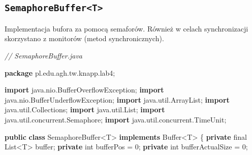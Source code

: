 \documentclass[11pt]{article}
\newenvironment{Shaded}{}{}
\newcommand{\KeywordTok}[1]{\textcolor[rgb]{0.00,0.44,0.13}{\textbf{{#1}}}}
\newcommand{\DataTypeTok}[1]{\textcolor[rgb]{0.56,0.13,0.00}{{#1}}}
\newcommand{\DecValTok}[1]{\textcolor[rgb]{0.25,0.63,0.44}{{#1}}}
\newcommand{\CommentTok}[1]{\textcolor[rgb]{0.38,0.63,0.69}{\textit{{#1}}}}
\newcommand{\NormalTok}[1]{{#1}}
\newcommand{\ImportTok}[1]{{#1}}
\newcommand{\OperatorTok}[1]{\textcolor[rgb]{0.40,0.40,0.40}{{#1}}}
\newcommand{\BuiltInTok}[1]{{#1}}
\begin{document}
    \hypertarget{semaphorebuffert}{%
\subsection{\texorpdfstring{\texttt{SemaphoreBuffer\textless{}T\textgreater{}}}{SemaphoreBuffer\textless T\textgreater{}}}\label{semaphorebuffert}}

Implementacja bufora za pomocą semaforów. Również w celach
synchronizacji skorzystano z monitorów (metod synchronicznych).

\begin{Shaded}
\begin{Highlighting}[]
\CommentTok{// SemaphoreBuffer.java}

\KeywordTok{package}\ImportTok{ pl}\OperatorTok{.}\ImportTok{edu}\OperatorTok{.}\ImportTok{agh}\OperatorTok{.}\ImportTok{tw}\OperatorTok{.}\ImportTok{knapp}\OperatorTok{.}\ImportTok{lab4}\OperatorTok{;}

\KeywordTok{import} \ImportTok{java}\OperatorTok{.}\ImportTok{nio}\OperatorTok{.}\ImportTok{BufferOverflowException}\OperatorTok{;}
\KeywordTok{import} \ImportTok{java}\OperatorTok{.}\ImportTok{nio}\OperatorTok{.}\ImportTok{BufferUnderflowException}\OperatorTok{;}
\KeywordTok{import} \ImportTok{java}\OperatorTok{.}\ImportTok{util}\OperatorTok{.}\ImportTok{ArrayList}\OperatorTok{;}
\KeywordTok{import} \ImportTok{java}\OperatorTok{.}\ImportTok{util}\OperatorTok{.}\ImportTok{Collections}\OperatorTok{;}
\KeywordTok{import} \ImportTok{java}\OperatorTok{.}\ImportTok{util}\OperatorTok{.}\ImportTok{List}\OperatorTok{;}
\KeywordTok{import} \ImportTok{java}\OperatorTok{.}\ImportTok{util}\OperatorTok{.}\ImportTok{concurrent}\OperatorTok{.}\ImportTok{Semaphore}\OperatorTok{;}
\KeywordTok{import} \ImportTok{java}\OperatorTok{.}\ImportTok{util}\OperatorTok{.}\ImportTok{concurrent}\OperatorTok{.}\ImportTok{TimeUnit}\OperatorTok{;}

\KeywordTok{public} \KeywordTok{class}\NormalTok{ SemaphoreBuffer}\OperatorTok{\textless{}}\NormalTok{T}\OperatorTok{\textgreater{}} \KeywordTok{implements} \BuiltInTok{Buffer}\OperatorTok{\textless{}}\NormalTok{T}\OperatorTok{\textgreater{}} \OperatorTok{\{}
    \KeywordTok{private} \DataTypeTok{final} \BuiltInTok{List}\OperatorTok{\textless{}}\NormalTok{T}\OperatorTok{\textgreater{}}\NormalTok{ buffer}\OperatorTok{;}
    \KeywordTok{private} \DataTypeTok{int}\NormalTok{ bufferPos }\OperatorTok{=} \DecValTok{0}\OperatorTok{;}
    \KeywordTok{private} \DataTypeTok{int}\NormalTok{ bufferActualSize }\OperatorTok{=} \DecValTok{0}\OperatorTok{;}


\end{Highlighting}
\end{Shaded}
\end{document}
